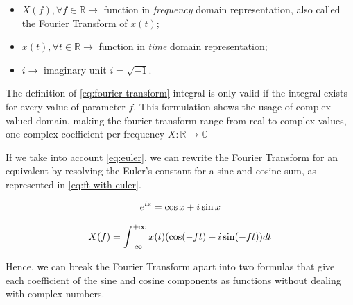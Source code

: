 \documentclass[
  oneside,
  11pt, a4paper,
  footinclude=true,
  headinclude=true,
  cleardoublepage=empty
]{scrbook}
\newcommand{\eqname}[1]{\tag*{#1}}%
\begin{document}
\begin{itemize}
    \item \( X(f), \forall f \in \mathbb{R} \rightarrow \) function in \textit{frequency} domain representation, also called the Fourier Transform of \( x(t) \);
    \item \( x(t), \forall t \in \mathbb{R} \rightarrow \) function in \textit{time} domain representation;
    \item \( i \rightarrow \) imaginary unit \( i = \sqrt{-1} \).
\end{itemize}

The definition of \autoref{eq:fourier-transform} integral is only valid if the integral exists for every value of parameter \(f\). 
This formulation shows the usage of complex-valued domain, making the fourier transform range from real to complex values, one complex coefficient per frequency \( X : \mathbb{R} \rightarrow \mathbb{C} \) 

If we take into account \autoref{eq:euler}, we can rewrite the Fourier Transform for an equivalent by resolving the Euler's constant for a sine and cosine sum, as represented in \autoref{eq:ft-with-euler}.

\begin{equation} \label{eq:euler}
    e^{ix} = \cos x + i \sin x \\ %
\end{equation}

\begin{equation} \label{eq:ft-with-euler}
    X(f) = \int_{-\infty}^{+\infty} x(t) (\cos (-f t) + i \sin (-f t)) dt \\
\end{equation}

Hence, we can break the Fourier Transform apart into two formulas that give each coefficient of the sine and cosine components as functions without dealing with complex numbers.
\end{document}
